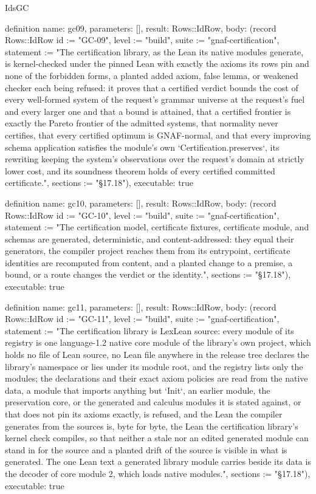 \begin{lexlean}{IdsGC}
\begin{semanticmodule}
definition{
  name: gc09,
  parameters: [],
  result: Rows::IdRow,
  body: (record Rows::IdRow {id := "GC-09", level := "build", suite := "gnaf-certification", statement := "The certification library, as the Lean its native modules generate, is kernel-checked under the pinned Lean with exactly the axioms its rows pin and none of the forbidden forms, a planted added axiom, false lemma, or weakened checker each being refused: it proves that a certified verdict bounds the cost of every well-formed system of the request's grammar universe at the request's fuel and every larger one and that a bound is attained, that a certified frontier is exactly the Pareto frontier of the admitted systems, that normality never certifies, that every certified optimum is GNAF-normal, and that every improving schema application satisfies the module's own `Certification.preserves`, its rewriting keeping the system's observations over the request's domain at strictly lower cost, and its soundness theorem holds of every certified committed certificate.", sections := "§17.18"}),
  executable: true
}

definition{
  name: gc10,
  parameters: [],
  result: Rows::IdRow,
  body: (record Rows::IdRow {id := "GC-10", level := "build", suite := "gnaf-certification", statement := "The certification model, certificate fixtures, certificate module, and schemas are generated, deterministic, and content-addressed: they equal their generators, the compiler project reaches them from its entrypoint, certificate identities are recomputed from content, and a planted change to a premise, a bound, or a route changes the verdict or the identity.", sections := "§17.18"}),
  executable: true
}

definition{
  name: gc11,
  parameters: [],
  result: Rows::IdRow,
  body: (record Rows::IdRow {id := "GC-11", level := "build", suite := "gnaf-certification", statement := "The certification library is LexLean source: every module of its registry is one language-1.2 native core module of the library's own project, which holds no file of Lean source, no Lean file anywhere in the release tree declares the library's namespace or lies under its module root, and the registry lists only the modules; the declarations and their exact axiom policies are read from the native data, a module that imports anything but `Init`, an earlier module, the preservation core, or the generated and calculus modules it is stated against, or that does not pin its axioms exactly, is refused, and the Lean the compiler generates from the sources is, byte for byte, the Lean the certification library's kernel check compiles, so that neither a stale nor an edited generated module can stand in for the source and a planted drift of the source is visible in what is generated. The one Lean text a generated library module carries beside its data is the decoder of core module 2, which loads native modules.", sections := "§17.18"}),
  executable: true
}
\end{semanticmodule}
\end{lexlean}
